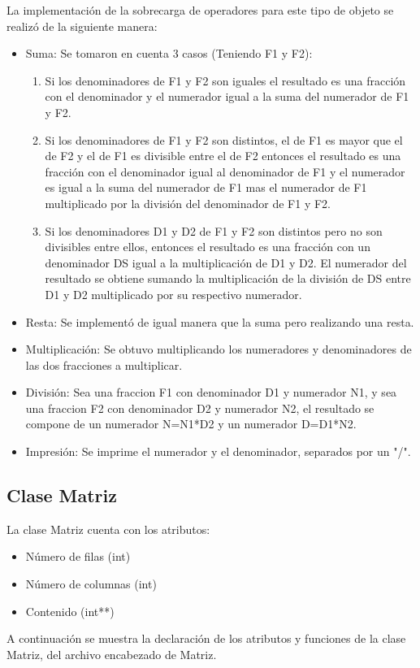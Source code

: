 \documentclass[11pt]{article}
\begin{document}
La implementación de la sobrecarga de operadores para este tipo de objeto se realizó de la siguiente manera:
\begin{itemize}
\item Suma: Se tomaron en cuenta 3 casos (Teniendo F1 y F2):
\begin{enumerate}
\item Si los denominadores de F1 y F2 son iguales el resultado es una fracción con el denominador y el numerador igual a la suma del numerador de F1 y F2.
\item Si los denominadores de F1 y F2 son distintos, el de F1 es mayor que el de F2 y el de F1 es divisible entre el de F2 entonces el resultado es una fracción con el denominador igual al denominador de F1 y el numerador es igual a la suma del numerador de F1 mas el numerador de F1 multiplicado por la división del denominador de F1 y F2.
\item Si los denominadores D1 y D2 de F1 y F2 son distintos pero no son divisibles entre ellos, entonces el resultado es una fracción con un denominador DS igual a la multiplicación de D1 y D2. El numerador del resultado se obtiene sumando la multiplicación de la división de DS entre D1 y D2 multiplicado por su respectivo numerador. 
\end{enumerate}
\item Resta: Se implementó de igual manera que la suma pero realizando una resta.
\item Multiplicación: Se obtuvo multiplicando los numeradores y denominadores de las dos fracciones a multiplicar.
\item División: Sea una fraccion F1 con denominador D1 y numerador N1, y sea una fraccion F2 con denominador D2 y numerador N2, el resultado se compone de un numerador N=N1*D2 y un numerador D=D1*N2. 
\item Impresión: Se imprime el numerador y el denominador, separados por un "/".
\end{itemize}

\newpage 
\subsection{Clase Matriz}
La clase Matriz cuenta con los atributos:
\begin{itemize}
\item Número de filas (int)
\item Número de columnas (int)
\item Contenido (int**)
\end{itemize}
A continuación se muestra la declaración de los atributos y funciones de la clase Matriz, del archivo encabezado de Matriz.
\end{document}
